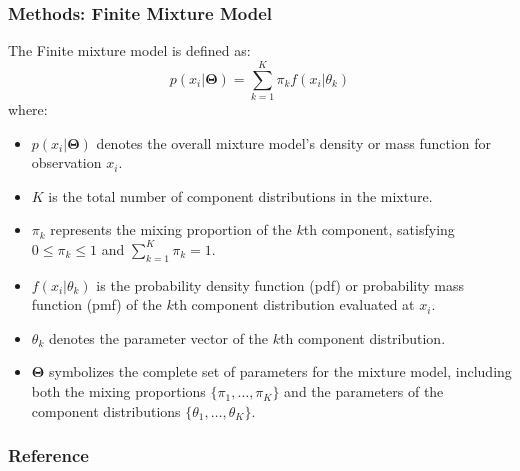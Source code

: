 \documentclass[xcolor=svgnames]{beamer}
\begin{document}
\begin{frame}\frametitle{Methods: Finite Mixture Model}

  The Finite mixture model is defined as:
\begin{equation}
p(x_i|\mathbf{\Theta}) = \sum_{k=1}^{K} \pi_k f(x_i|\theta_k)
\end{equation}
where:
{\small
\begin{itemize}
    \item $p(x_i|\mathbf{\Theta})$ denotes the overall mixture model's density or mass function for observation $x_i$.
    \item $K$ is the total number of component distributions in the mixture.
    \item $\pi_k$ represents the mixing proportion of the $k$th component, satisfying $0 \leq \pi_k \leq 1$ and $\sum_{k=1}^{K} \pi_k = 1$.
    \item $f(x_i|\theta_k)$ is the probability density function (pdf) or probability mass function (pmf) of the $k$th component distribution evaluated at $x_i$.
    \item $\theta_k$ denotes the parameter vector of the $k$th component distribution.
    \item $\mathbf{\Theta}$ symbolizes the complete set of parameters for the mixture model, including both the mixing proportions $\{\pi_1, \ldots, \pi_K\}$ and the parameters of the component distributions $\{\theta_1, \ldots, \theta_K\}$.
\end{itemize}
}

\end{frame}




\begin{frame}\frametitle{Reference}


\end{frame}
\end{document}
